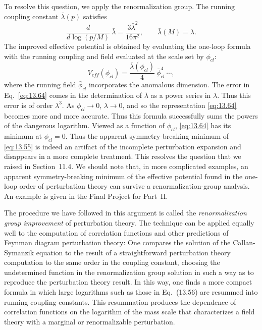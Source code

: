 To resolve this question, we apply the renormalization group.  The running
coupling constant $\bar{\lambda}(p)$ satisfies
\begin{equation}
  \frac{d}{d\log(p/M)}\ \bar{\lambda} = \frac{3\bar{\lambda}^2}{16\pi^2},
  \qquad \bar{\lambda}(M) = \lambda .
\end{equation}
The improved effective potential is obtained by evaluating the one-loop
formula with the running coupling and field evaluated at the scale set by
$\phi_{cl}$:
\begin{equation}
  V_{eff}(\phi_{cl}) = \frac{\bar{\lambda}(\phi_{cl})}{4}\ \bar{\phi}_{cl}^4
    \ \cdots ,
  \label{eq:13.64}
\end{equation}
where the running field $\bar{\phi}_{cl}$ incorporates the anomalous
dimension.  The error in Eq.~\eqref{eq:13.64} comes in the determination of
$\bar{\lambda}$ as a power series in $\lambda$.  Thus this error is of order
$\lambda^3$.  As $\phi_{cl}\to 0$, $\lambda\to 0$, and so the representation
\eqref{eq:13.64} becomes more and more accurate.  Thus this formula
successfully sums the powers of the dangerous logarithm.  Viewed as a
function of $\phi_{cl}$, \eqref{eq:13.64} has its minimum at
$\phi_{cl} = 0$.  Thus the apparent symmetry-breaking minimum of
\eqref{eq:13.55} is indeed an artifact of the incomplete perturbation
expansion and disappears in a more complete treatment.  This resolves the
question that we raised in Section~11.4.  We should note that, in more
complicated examples, an apparent symmetry-breaking minimum of the effective
potential found in the one-loop order of perturbation theory can survive a
renormalization-group analysis.  An example is given in the Final Project for
Part~II.

The procedure we have followed in this argument is called the
\emph{renormalization group improvement} of perturbation theory.  The
technique can be applied equally well to the computation of correlation
functions and other predictions of Feynman diagram perturbation theory: One
compares the solution of the Callan-Symanzik equation to the result of a
straightforward perturbation theory computation to the same order in the
coupling constant, choosing the undetermined function in the renormalization
group solution in such a way as to reproduce the perturbation theory result.
In this way, one finds a more compact formula in which large logarithms such
as those in Eq.~(13.56) are resummed into running coupling constants.
This resummation produces the dependence of correlation functions on the
logarithm of the mass scale that characterizes a field theory with a marginal
or renormalizable perturbation.

